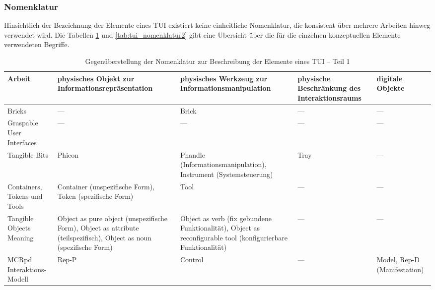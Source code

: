 \subsubsection{Nomenklatur}

Hinsichtlich der Bezeichnung der Elemente eines \gls{TUI} existiert keine einheitliche Nomenklatur, die konsistent über mehrere Arbeiten hinweg verwendet wird. Die Tabellen \ref{tab:tui_nomenklatur1} und \ref{tab:tui_nomenklatur2} gibt eine Übersicht über die für die einzelnen konzeptuellen Elemente verwendeten Begriffe.

\begin{table}[htbp]
		\centering
	\caption{Gegenüberstellung der Nomenklatur zur Beschreibung der Elemente eines TUI -- Teil 1}  
	\begin{tabular}{|p{2.2cm}||p{3cm}|p{3cm}|p{2cm}|p{2cm}|} \hline
			Arbeit & physisches Objekt zur Informations\-repräsentation & physisches Werkzeug zur Informations\-manipulation & physische Beschränkung des Interaktionsraums & digitale Objekte \\ \hline \hline
		
		Bricks & --- & Brick & --- & --- \\ \hline
		Graspable User Interfaces & --- & --- & --- & --- \\ \hline
		Tangible Bits & Phicon & Phandle (Informationsmanipulation), Instrument (Systemsteuerung) & Tray & --- \\ \hline
		Containers, Tokens und Tools & Container (unspezifische Form), Token (spezifische Form) & Tool & --- & --- \\ \hline
		Tangible Objects Meaning & Object as pure object (unspezifische Form), Object as attribute (teilspezifisch), Object as noun (spezifische Form) & Object as verb (fix gebundene Funktionalität), Object as reconfigurable tool (konfigurierbare Funktionalität) & --- & --- \\ \hline
		MCRpd Inter\-aktions-Modell &  Rep-P & Control & --- & Model, Rep-D (Manifestation)\\ \hline
	\end{tabular}

			\label{tab:tui_nomenklatur1}
\end{table}


